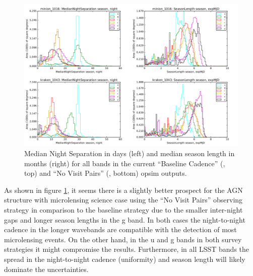\begin{center}
	\begin{figure}[hbt]
		\includegraphics[width=\textwidth]{figs/agn/NightSep_seasonLength.pdf}
		\caption{Median Night Separation in days (left) and median season length in months (right) for all bands in the current ``Baseline Cadence'' (, top) and ``No Visit Pairs''	(, bottom) opsim outputs.}
		\label{microfig}
	\end{figure}
\end{center}

As shown in figure \ref{microfig}, it seems there is a slightly better prospect
for the AGN structure with microlensing science case using the ``No Visit Pairs'' observing
strategy in comparison to the baseline strategy due to the smaller inter-night
gaps and longer season lengths in the g band. In both cases the night-to-night
cadence in the longer wavebands are compatible with the detection of most
microlensing events. On the other hand, in the u and g bands in both survey strategies it might compromise the results. Furthermore, in all LSST bands the spread in the night-to-night cadence (uniformity) and season length will likely dominate the uncertainties.

